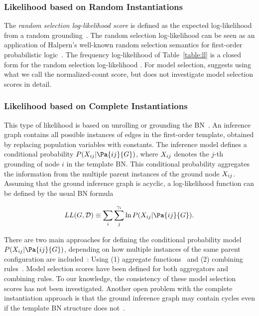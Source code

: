 \documentclass[letterpaper]{article}
\begin{document}
\subsubsection{Likelihood based on Random Instantiations}
The {\em random selection log-likelihood score} is defined as the expected log-likelihood from a random grounding~\cite{Schulte2011}.
The random selection log-likelihood can be seen as an application of Halpern's well-known random selection semantics for first-order probabilistic logic~\cite{Halpern90}. 
The frequency log-likelihood of Table~\ref{table:ll} is a closed form for the random selection log-likelihood \cite[Prop.4.1]{Schulte2012}. For model selection, \cite{Schulte2012} suggests using what we call the normalized-count score, but does not investigate model selection scores in detail.

\subsubsection{Likelihood based on Complete Instantiations} This type of likelihood is based on  unrolling or grounding the BN~\cite{Heckerman+al:SRL07,Neville2007,Poole2003}. An inference graph contains all possible instances of edges in the first-order template, obtained by replacing population variables with constants. The inference model defines a conditional probability $P(\node_{ij}|\Pa{ij}{\graph})$, where $X_{ij}$ denotes the $j$-th grounding of node $i$ in the template BN. This conditional probability aggregates the information from the multiple parent instances of the ground node $X_{ij}$. Assuming that the ground inference graph is acyclic, a log-likelihood function can be defined by the usual BN formula 

\begin{equation}
\Score{\loglikelihood}{\graph}{\dstructure} \equiv \sum_{i} \sum_{j}^{\groundnode{i}}\ln P(\node_{ij}|\Pa{ij}{\graph}).
\end{equation}
 
There are two main approaches for defining the conditional probability model $P(\node_{ij}|\Pa{ij}{\graph})$, depending on how multiple instances of the same parent configuration are included~\cite{Natarajan2008}: Using (1) aggregate functions~\cite{Getoor2007c} and (2) combining rules~\cite{Kersting2007}. Model selection scores have been defined for both aggregators \cite{Getoor2007c} and combining rules. To our knowledge, the consistency of these model selection scores has not been investigated. Another open problem  with the complete instantiation approach is that the ground inference graph may contain cycles even if the template BN structure does not~\cite{Lowd2007}. 
\end{document}
